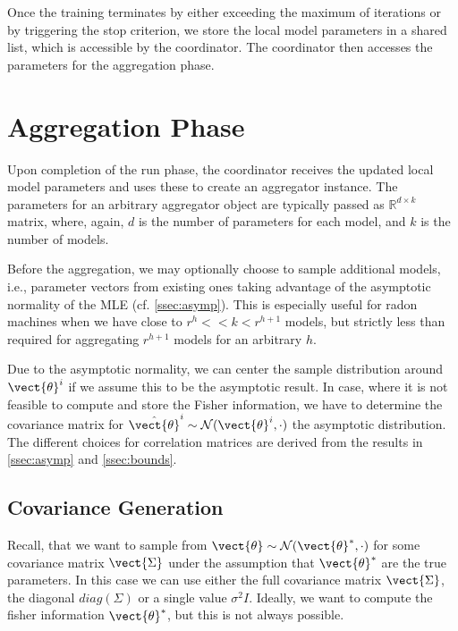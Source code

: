 Once the training terminates by either exceeding the maximum of iterations or by triggering the stop criterion, we store the local model parameters in a shared list, which is accessible by the coordinator. 
The coordinator then accesses the parameters for the aggregation phase.


\section{Aggregation Phase}
Upon completion of the run phase, the coordinator receives the updated local model parameters and uses these to create an aggregator instance.
The parameters for an arbitrary aggregator object are typically passed as $\mathbb{R}^{d \times k}$ matrix, where, again, $d$ is the number of parameters for each model, and $k$ is the number of models.

Before the aggregation, we may optionally choose to sample additional models, i.e., parameter vectors from existing ones taking advantage of the asymptotic normality of the MLE (cf. \autoref{ssec:asymp}).
This is especially useful for radon machines when we have close to $ r^h << k < r^{h+1}$ models, but strictly less than required for aggregating $r^{h+1}$ models for an arbitrary $h$.

Due to the asymptotic normality, we can center the sample distribution around $\vect{\theta}^i$ if we assume this to be the asymptotic result.
In case, where it is not feasible to compute and store the Fisher information, we have to determine the covariance matrix for $\hat{\vect{\theta}}^i \sim \mathcal{N}(\vect{\theta}^i, \cdot)$ the asymptotic distribution.
The different choices for correlation matrices are derived from the results in \autoref{ssec:asymp} and \autoref{ssec:bounds}.

\subsection{Covariance Generation}
\label{ssec:covgen}

Recall, that we want to sample from $\vect{\theta} \sim \mathcal{N}(\vect{\theta}^*, \cdot)$ for some covariance matrix $\vect{\Sigma}$ under the assumption that $\vect{\theta}^*$ are the true parameters.
In this case we can use either the full covariance matrix $\vect{\Sigma}$, the diagonal $diag(\Sigma)$ or a single value $\sigma^2 I$.
Ideally, we want to compute the fisher information \wrt $\vect{\theta}^*$, but this is not always possible.

